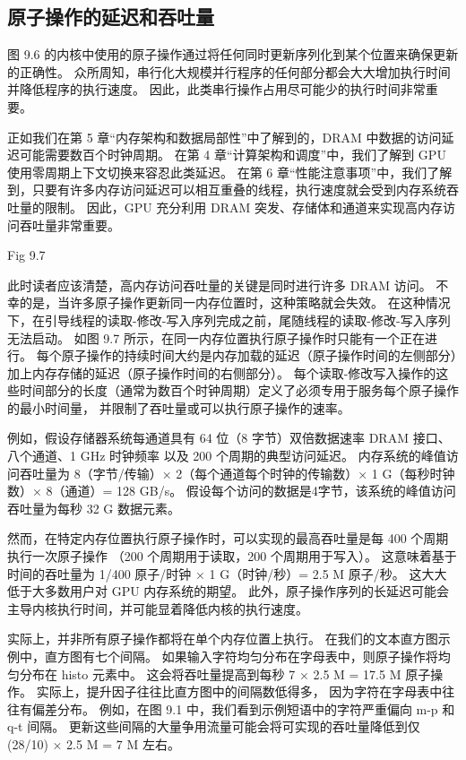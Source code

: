 \subsection{原子操作的延迟和吞吐量}
图 9.6 的内核中使用的原子操作通过将任何同时更新序列化到某个位置来确保更新的正确性。 
众所周知，串行化大规模并行程序的任何部分都会大大增加执行时间并降低程序的执行速度。 
因此，此类串行操作占用尽可能少的执行时间非常重要。

正如我们在第 5 章“内存架构和数据局部性”中了解到的，DRAM 中数据的访问延迟可能需要数百个时钟周期。 
在第 4 章“计算架构和调度”中，我们了解到 GPU 使用零周期上下文切换来容忍此类延迟。 
在第 6 章“性能注意事项”中，我们了解到，只要有许多内存访问延迟可以相互重叠的线程，执行速度就会受到内存系统吞吐量的限制。 
因此，GPU 充分利用 DRAM 突发、存储体和通道来实现高内存访问吞吐量非常重要。

{\color{red} Fig 9.7}

此时读者应该清楚，高内存访问吞吐量的关键是同时进行许多 DRAM 访问。 
不幸的是，当许多原子操作更新同一内存位置时，这种策略就会失效。 
在这种情况下，在引导线程的读取-修改-写入序列完成之前，尾随线程的读取-修改-写入序列无法启动。 
如图 9.7 所示，在同一内存位置执行原子操作时只能有一个正在进行。 
每个原子操作的持续时间大约是内存加载的延迟（原子操作时间的左侧部分）加上内存存储的延迟（原子操作时间的右侧部分）。 
每个读取-修改写入操作的这些时间部分的长度（通常为数百个时钟周期）定义了必须专用于服务每个原子操作的最小时间量，
并限制了吞吐量或可以执行原子操作的速率。

例如，假设存储器系统每通道具有 64 位（8 字节）双倍数据速率 DRAM 接口、八个通道、1 GHz 时钟频率
以及 200 个周期的典型访问延迟。 
内存系统的峰值访问吞吐量为 8（字节/传输）× 2（每个通道每个时钟的传输数）× 1 G（每秒时钟数）× 8（通道）= 128 GB/s。 
假设每个访问的数据是4字节，该系统的峰值访问吞吐量为每秒 32 G 数据元素。

然而，在特定内存位置执行原子操作时，可以实现的最高吞吐量是每 400 个周期执行一次原子操作
（200 个周期用于读取，200 个周期用于写入）。 
这意味着基于时间的吞吐量为 1/400 原子/时钟 × 1 G（时钟/秒）= 2.5 M 原子/秒。 
这大大低于大多数用户对 GPU 内存系统的期望。 此外，原子操作序列的长延迟可能会主导内核执行时间，并可能显着降低内核的执行速度。

实际上，并非所有原子操作都将在单个内存位置上执行。 在我们的文本直方图示例中，直方图有七个间隔。 
如果输入字符均匀分布在字母表中，则原子操作将均匀分布在 histo 元素中。 
这会将吞吐量提高到每秒 7 × 2.5 M = 17.5 M 原子操作。 实际上，提升因子往往比直方图中的间隔数低得多，
因为字符在字母表中往往有偏差分布。 例如，在图 9.1 中，我们看到示例短语中的字符严重偏向 m-p 和 q-t 间隔。 
更新这些间隔的大量争用流量可能会将可实现的吞吐量降低到仅 (28/10) × 2.5 M = 7 M 左右。

